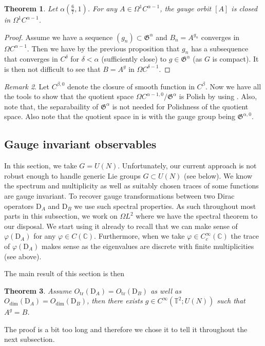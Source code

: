 \documentclass[12pt]{article}
\numberwithin{equation}{section}
\newtheorem{theorem}{Theorem}[section]
\theoremstyle{definition}
\theoremstyle{remark}
\newtheorem{remark}[theorem]{Remark}
\newcommand{\1}{\mathbf 1}
\newcommand{\<}{\langle}
\renewcommand{\>}{\rangle}
\newcommand{\tr}{\operatorname{tr}}
\newcommand{\rmD}{\mathrm{D}}
\newcommand{\fG}{\mathfrak{G}}
\newcommand{\bC}{\mathbb C}
\newcommand{\bT}{\mathbb T}
\begin{document}
\begin{theorem}
    Let $\alpha(\frac 67,1)$. For any $A\in\Omega^1 C^{\alpha-1}$, the gauge orbit $[A]$ is closed in $\Omega^1 C^{\alpha-1}$. 
\end{theorem}

\begin{proof}
Assume we have a sequence $(g_n)\subset \fG^\alpha$ and $B_n=A^{g_n}$ converges in $\Omega C^{\alpha-1}$. Then we have by the previous proposition that $g_n$ has a subsequence that converges in $C^{\delta}$ for $\delta<\alpha$ (sufficiently close) to $g\in\fG^\alpha$ (as $G$ is compact). It is then not difficult to see that $B=A^g$ in $\Omega C^{\delta-1}$. 
\end{proof}

\begin{remark}
    Let $C^{\beta,0}$ denote the closure of smooth function in $C^\beta$. Now we have all the tools to show that the quotient space $\Omega C^{\alpha-1,0}/\fG^\alpha$ is Polish by using . Also, note that, the separabaility of $\fG^\alpha$ is not needed for Polishness of the quotient space. Also note that the quotient space in \cite{CCHS2d} is with the  gauge group being  $\fG^{\alpha,0}$.  
\end{remark}

\subsection{Gauge invariant observables}

In this section, we take $G=U(N)$. Unfortunately, our current approach is not robust enough to handle generic Lie groups $G\subset U(N)$ (see  below). We know the spectrum and multiplicity as well as suitably chosen traces of some functions are gauge invariant. To recover gauge transformations between two Dirac operators $\rmD_A$ and $\rmD_B$ we use such spectral properties. As such throughout most parts in this subsection, we work on $\Omega L^2$ where we have the spectral theorem to our disposal. We start using it already to recall that we can make sense of $\varphi(\rmD_A)$ for any $\varphi\in C(\bC)$. Furthermore, when we take $\varphi\in C^\infty_c(\bC)$ the trace of $\varphi(\rmD_A)$ makes sense as the eigenvalues are discrete with finite multiplicities (see  above). 


The main result of this section is then 
\begin{theorem}\label{thm:recover_gauge_smooth}
    Assume $O_{\tr}(\rmD_A)=O_{\tr}(\rmD_B)$ as well as $O_{\dim}(\rmD_A)=O_{\dim}(\rmD_B)$, then there exists $g\in C^\infty(\bT^2;U(N))$ such that $A^g=B$. 
\end{theorem}
The proof is a bit too long and therefore we chose it to tell it throughout the next subsection.






\end{document}
